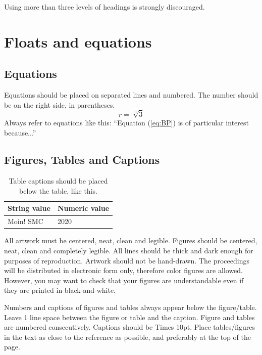 \documentclass{article}
\begin{document}
Using more than three levels of headings is strongly discouraged.





\section{Floats and equations}

\subsection{Equations}
Equations should be placed on separated lines and numbered. The number should be on the right side, in parentheses.
\begin{equation}
r=\sqrt[13]{3}
\label{eq:BP}
\end{equation}
Always refer to equations like this: ``Equation (\ref{eq:BP}) is of particular interest because...''

\subsection{Figures, Tables and Captions}
\begin{table}[t]
 \begin{center}
 \begin{tabular}{|l|l|}
  \hline
  String value & Numeric value \\
  \hline
  Moin! SMC & 2020 \\
  \hline
 \end{tabular}
\end{center}
 \caption{Table captions should be placed below the table,  like this.}
 \label{tab:example}
\end{table}

All artwork must be centered, neat, clean and legible. Figures should be centered, neat, clean
and completely legible. All lines should be thick and dark enough for purposes of reproduction. Artwork should not be hand-drawn. The proceedings will be distributed in electronic form only, therefore color figures are allowed. However, you may want to check that your figures are understandable even if they are printed in black-and-white.


Numbers and captions of figures and tables always appear below the figure/table.
Leave 1 line space between the figure or table and the caption.
Figure and tables are numbered consecutively.
Captions should be Times 10pt. Place tables/figures in the text as close to the reference as possible,
and preferably at the top of the page.
\end{document}
